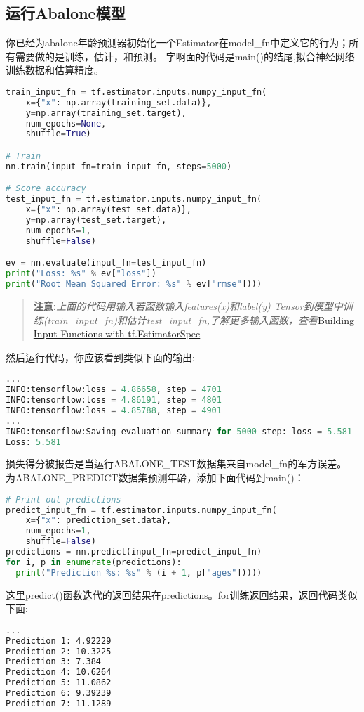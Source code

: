 \subsection{运行Abalone模型}
你已经为abalone年龄预测器初始化一个Estimator在model\_fn中定义它的行为；所有需要做的是训练，估计，和预测。
字啊面的代码是main()的结尾,拟合神经网络训练数据和估算精度。
\begin{lstlisting}[language=Python]
train_input_fn = tf.estimator.inputs.numpy_input_fn(
    x={"x": np.array(training_set.data)},
    y=np.array(training_set.target),
    num_epochs=None,
    shuffle=True)

# Train
nn.train(input_fn=train_input_fn, steps=5000)

# Score accuracy
test_input_fn = tf.estimator.inputs.numpy_input_fn(
    x={"x": np.array(test_set.data)},
    y=np.array(test_set.target),
    num_epochs=1,
    shuffle=False)

ev = nn.evaluate(input_fn=test_input_fn)
print("Loss: %s" % ev["loss"])
print("Root Mean Squared Error: %s" % ev["rmse"])))
\end{lstlisting}
\begin{quote}
\textbf{注意:}\emph{上面的代码用输入若函数输入features(x)和label(y) Tensor到模型中训练(train\_input\_fn)和估计test\_input\_fn,了解更多输入函数，查看}\href{https://www.tensorflow.org/get_started/input_fn}{Building Input Functions with tf.EstimatorSpec}
\end{quote}
然后运行代码，你应该看到类似下面的输出:
\begin{lstlisting}[language=Python]
...
INFO:tensorflow:loss = 4.86658, step = 4701
INFO:tensorflow:loss = 4.86191, step = 4801
INFO:tensorflow:loss = 4.85788, step = 4901
...
INFO:tensorflow:Saving evaluation summary for 5000 step: loss = 5.581
Loss: 5.581
\end{lstlisting}
损失得分被报告是当运行ABALONE\_TEST数据集来自model\_fn的军方误差。
为ABALONE\_PREDICT数据集预测年龄，添加下面代码到main()：
\begin{lstlisting}[language=Python]
# Print out predictions
predict_input_fn = tf.estimator.inputs.numpy_input_fn(
    x={"x": prediction_set.data},
    num_epochs=1,
    shuffle=False)
predictions = nn.predict(input_fn=predict_input_fn)
for i, p in enumerate(predictions):
  print("Prediction %s: %s" % (i + 1, p["ages"]))))
\end{lstlisting}
这里predict()函数迭代的返回结果在predictions。for训练返回结果，返回代码类似下面:
\begin{lstlisting}[language=Bash]
...
Prediction 1: 4.92229
Prediction 2: 10.3225
Prediction 3: 7.384
Prediction 4: 10.6264
Prediction 5: 11.0862
Prediction 6: 9.39239
Prediction 7: 11.1289
\end{lstlisting}
